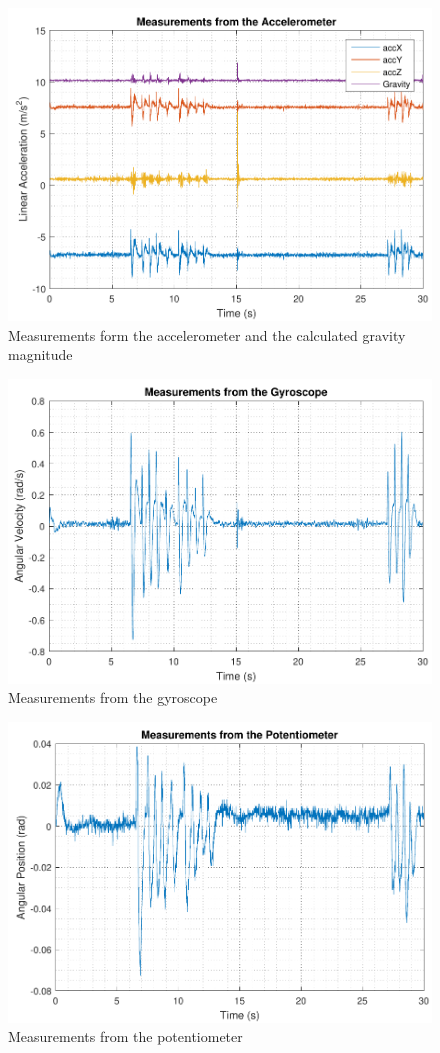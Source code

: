 \begin{figure}[H]
	\includegraphics[scale=.75]{figures/accData}
	\centering
	\caption{Measurements form the accelerometer and the calculated gravity magnitude}
\end{figure} \label{accData}
%
\begin{figure}[H]
	\includegraphics[scale=.75]{figures/gyroData}
	\centering
	\caption{Measurements from the gyroscope}
\end{figure} \label{gyroData}
%
\begin{figure}[H]
	\includegraphics[scale=.75]{figures/potData}
	\centering
	\caption{Measurements from the potentiometer}
\end{figure} \label{potData}
